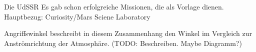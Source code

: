 Die UdSSR 
Es gab schon erfolgreiche Missionen, die als Vorlage dienen. Hauptbezug: Curiosity/Mars Sciene Laboratory

 Angriffswinkel beschreibt in diesem Zusammenhang den Winkel im Vergleich zur Anströmrichtung der Atmosphäre. (TODO: Beschreiben. Maybe Diagramm?)